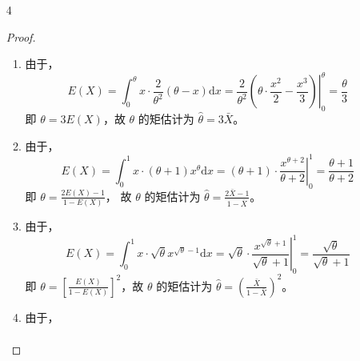 \documentclass[normal,founder,mtpro2,cn]{elegantnote}
\begin{document}
\begin{enumerate}
\begin{proof}
\begin{enumerate}
\begin{equation*}
\begin{aligned}
                              =     & \theta^{2}\cdot\frac{2}{\theta^{3}}=\frac{2}{\theta}
                          \end{aligned}
                      \end{equation*}
                      即 $\theta=\frac{2}{E(X)}$，故 $\theta$ 的矩估计为 $\hat{\theta}=\frac{2}{\bar{X}}$。
            \end{enumerate}
        \end{proof}
    \item[4]
        \begin{proof}
            \begin{enumerate}
                \item
                      由于，
                      \begin{equation*}
                          E(X)=\int_{0}^{\theta}x\cdot\frac{2}{\theta^{2}}(\theta-x)\mathrm{d}x=\left.\frac{2}{\theta^{2}}\left(\theta\cdot\frac{x^{2}}{2}-\frac{x^{3}}{3}\right)\right|_{0}^{\theta}=\frac{\theta}{3}
                      \end{equation*}
                      即 $\theta=3E(X)$，故 $\theta$ 的矩估计为 $\hat{\theta}=3\bar{X}$。
                \item
                      由于，
                      \begin{equation*}
                          E(X)=\int_{0}^{1}x\cdot(\theta+1)x^{\theta}\mathrm{d}x=\left.(\theta+1)\cdot\frac{x^{\theta+2}}{\theta+2}\right|_{0}^{1}=\frac{\theta+1}{\theta+2}
                      \end{equation*}
                      即 $\theta=\frac{2E(X)-1}{1-E(X)}$，
                      故 $\theta$ 的矩估计为 $\hat{\theta}=\frac{2\bar{X}-1}{1-\bar{X}}$。
                \item
                      由于，
                      \begin{equation*}
                          E(X)=\int_{0}^{1}x\cdot\sqrt{\theta}x^{\sqrt{\theta}-1}\mathrm{d}x=\left.\sqrt{\theta}\cdot\frac{x^{\sqrt{\theta}+1}}{\sqrt{\theta}+1}\right|_{0} ^{1}=\frac{\sqrt{\theta}}{\sqrt{\theta}+1}
                      \end{equation*}
                      即 $\theta=\left[\frac{E(X)}{1-E(X)}\right]^{2}$，故 $\theta$ 的矩估计为 $\hat{\theta}=\left(\frac{\bar{X}}{1-\bar{X}}\right)^{2}$。
                \item
                      由于，
                      \begin{equation*}
                          \begin{aligned}

\end{aligned}
\end{equation*}
\end{enumerate}
\end{proof}
\end{enumerate}
\end{document}

